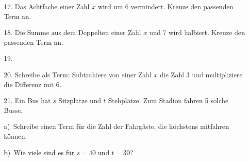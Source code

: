 \documentclass[11pt]{article}
\begin{document}
\begin{pfaufg}{}{17.}{}
Das Achtfache einer Zahl $x$ wird um 6 vermindert. Kreuze den passenden Term an.\par\smallskip {}\par {}
\end{pfaufg}

\begin{pfaufg}{}{18.}{}
Die Summe aus dem Doppelten einer Zahl $x$ und 7 wird halbiert. Kreuze den passenden Term an.\par\smallskip {}\par {}
\end{pfaufg}

\begin{pfaufg}{}{19.}{}
\end{pfaufg}

\begin{pfaufg}{}{20.}{}
Schreibe als Term: Subtrahiere von einer Zahl $x$ die Zahl 3 und multipliziere die Differenz mit 6.
\end{pfaufg}

\begin{pfaufg}{}{21.}{}
Ein Bus hat $s$ Sitzplätze und $t$ Stehplätze. Zum Stadion fahren 5 solche Busse. \par a)~Schreibe einen Term für die Zahl der Fahrgäste, die höchstens mitfahren können. \par b)~Wie viele sind es für $s = 40$ und $t = 30$?
\end{pfaufg}
\end{document}
